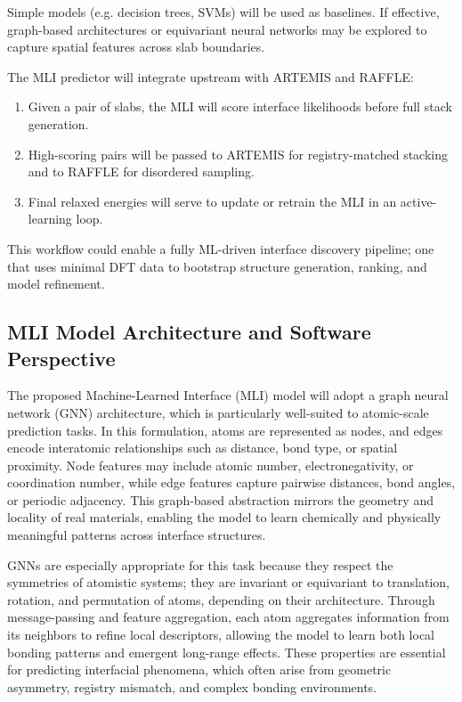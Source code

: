 Simple models (e.g. decision trees, SVMs) will be used as baselines.
If effective, graph-based architectures or equivariant neural networks may be explored to capture spatial features across slab boundaries.

The MLI predictor will integrate upstream with ARTEMIS and RAFFLE:
\begin{enumerate}
    \item Given a pair of slabs, the MLI will score interface likelihoods before full stack generation.
    \item High-scoring pairs will be passed to ARTEMIS for registry-matched stacking and to RAFFLE for disordered sampling.
    \item Final relaxed energies will serve to update or retrain the MLI in an active-learning loop.
\end{enumerate}

This workflow could enable a fully ML-driven interface discovery pipeline; one that uses minimal DFT data to bootstrap structure generation, ranking, and model refinement.

\subsection*{MLI Model Architecture and Software Perspective}

The proposed Machine-Learned Interface (MLI) model will adopt a graph neural network (GNN) architecture, which is particularly well-suited to atomic-scale prediction tasks.
In this formulation, atoms are represented as nodes, and edges encode interatomic relationships such as distance, bond type, or spatial proximity.
Node features may include atomic number, electronegativity, or coordination number, while edge features capture pairwise distances, bond angles, or periodic adjacency.
This graph-based abstraction mirrors the geometry and locality of real materials, enabling the model to learn chemically and physically meaningful patterns across interface structures.

GNNs are especially appropriate for this task because they respect the symmetries of atomistic systems; they are invariant or equivariant to translation, rotation, and permutation of atoms, depending on their architecture.
Through message-passing and feature aggregation, each atom aggregates information from its neighbors to refine local descriptors, allowing the model to learn both local bonding patterns and emergent long-range effects.
These properties are essential for predicting interfacial phenomena, which often arise from geometric asymmetry, registry mismatch, and complex bonding environments\cite{Schutt2017-ge, Schutt2019-sz, Batzner2022-fd, Deng2023-tg}.

